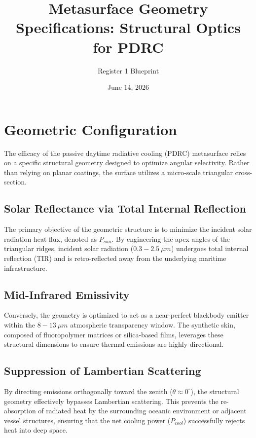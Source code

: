 \documentclass[12pt]{article}
\title{Metasurface Geometry Specifications: Structural Optics for PDRC}
\author{Register 1 Blueprint}
\date{June 14, 2026}
\begin{document}
\maketitle

\section{Geometric Configuration}
The efficacy of the passive daytime radiative cooling (PDRC) metasurface relies on a specific structural geometry designed to optimize angular selectivity. Rather than relying on planar coatings, the surface utilizes a micro-scale triangular cross-section.

\subsection{Solar Reflectance via Total Internal Reflection}
The primary objective of the geometric structure is to minimize the incident solar radiation heat flux, denoted as $P_{sun}$. By engineering the apex angles of the triangular ridges, incident solar radiation ($0.3-2.5~\mu m$) undergoes total internal reflection (TIR) and is retro-reflected away from the underlying maritime infrastructure. 

\subsection{Mid-Infrared Emissivity}
Conversely, the geometry is optimized to act as a near-perfect blackbody emitter within the $8-13~\mu m$ atmospheric transparency window. The synthetic skin, composed of fluoropolymer matrices or silica-based films, leverages these structural dimensions to ensure thermal emissions are highly directional.

\subsection{Suppression of Lambertian Scattering}
By directing emissions orthogonally toward the zenith ($\theta \approx 0^\circ$), the structural geometry effectively bypasses Lambertian scattering. This prevents the re-absorption of radiated heat by the surrounding oceanic environment or adjacent vessel structures, ensuring that the net cooling power ($P_{cool}$) successfully rejects heat into deep space.
\end{document}
